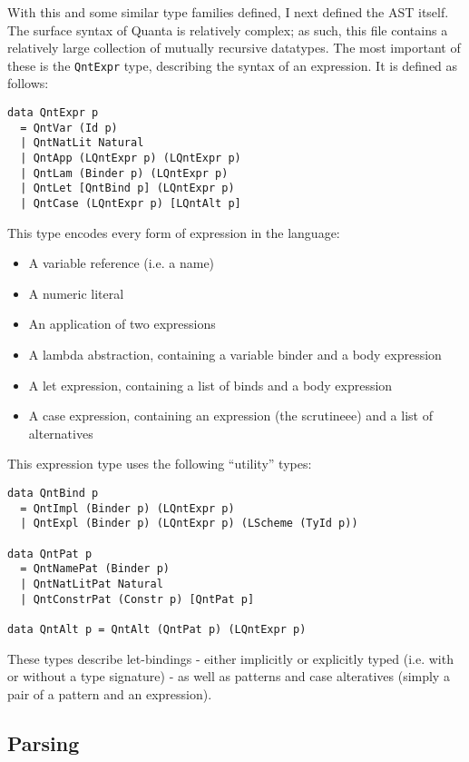 \documentclass[9pt]{extarticle}
\begin{document}
With this and some similar type families defined, I next defined the AST
itself. The surface syntax of Quanta is relatively complex; as such,
this file contains a relatively large collection of mutually recursive
datatypes. The most important of these is the \verb'QntExpr' type,
describing the syntax of an expression. It is defined as follows:

\begin{verbatim}
data QntExpr p
  = QntVar (Id p)
  | QntNatLit Natural
  | QntApp (LQntExpr p) (LQntExpr p)
  | QntLam (Binder p) (LQntExpr p)
  | QntLet [QntBind p] (LQntExpr p)
  | QntCase (LQntExpr p) [LQntAlt p]
\end{verbatim}

This type encodes every form of expression in the language:
\begin{itemize}
  \item A variable reference (i.e. a name)
  \item A numeric literal
  \item An application of two expressions
  \item A lambda abstraction, containing a variable binder and a body expression
  \item A let expression, containing a list of binds and a body expression
  \item A case expression, containing an expression (the scrutineee) and a list of alternatives
\end{itemize}

This expression type uses the following ``utility'' types:

\begin{verbatim}
data QntBind p
  = QntImpl (Binder p) (LQntExpr p)
  | QntExpl (Binder p) (LQntExpr p) (LScheme (TyId p))

data QntPat p
  = QntNamePat (Binder p)
  | QntNatLitPat Natural
  | QntConstrPat (Constr p) [QntPat p]

data QntAlt p = QntAlt (QntPat p) (LQntExpr p)
\end{verbatim}

These types describe let-bindings - either implicitly or explicitly
typed (i.e. with or without a type signature) - as well as patterns and
case alteratives (simply a pair of a pattern and an expression).

\subsection{Parsing}
\end{document}
